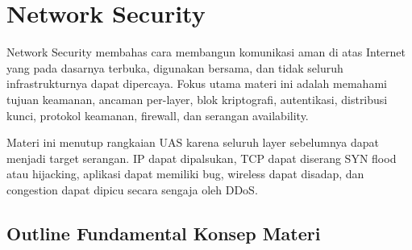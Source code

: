 \section{Network Security}

Network Security membahas cara membangun komunikasi aman di atas Internet yang pada dasarnya terbuka, digunakan bersama, dan tidak seluruh infrastrukturnya dapat dipercaya. Fokus utama materi ini adalah memahami tujuan keamanan, ancaman per-layer, blok kriptografi, autentikasi, distribusi kunci, protokol keamanan, firewall, dan serangan availability.

Materi ini menutup rangkaian UAS karena seluruh layer sebelumnya dapat menjadi target serangan. IP dapat dipalsukan, TCP dapat diserang SYN flood atau hijacking, aplikasi dapat memiliki bug, wireless dapat disadap, dan congestion dapat dipicu secara sengaja oleh DDoS.

\subsection{Outline Fundamental Konsep Materi}

